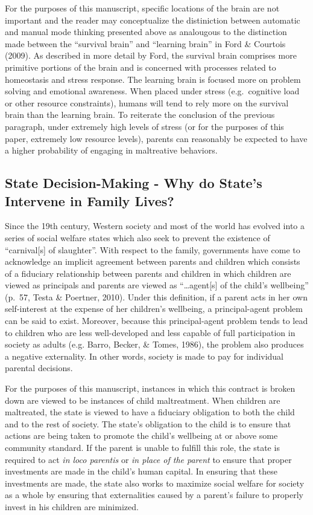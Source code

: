 \documentclass[]{elsarticle}
\begin{document}
For the purposes of this manuscript, specific locations of the brain are
not important and the reader may conceptualize the distiniction between
automatic and manual mode thinking presented above as analougous to the
distinction made between the ``survival brain'' and ``learning brain''
in Ford \& Courtois (2009). As described in more detail by Ford, the
survival brain comprises more primitive portions of the brain and is
concerned with processes related to homeostasis and stress response. The
learning brain is focused more on problem solving and emotional
awareness. When placed under stress (e.g.~cognitive load or other
resource constraints), humans will tend to rely more on the survival
brain than the learning brain. To reiterate the conclusion of the
previous paragraph, under extremely high levels of stress (or for the
purposes of this paper, extremely low resource levels), parents can
reasonably be expected to have a higher probability of engaging in
maltreative behaviors.

\subsection{State Decision-Making - Why do State's Intervene in Family
Lives?}\label{state-decision-making---why-do-states-intervene-in-family-lives}

Since the 19th century, Western society and most of the world has
evolved into a series of social welfare states which also seek to
prevent the existence of ``carnival{[}s{]} of slaughter''. With respect
to the family, governments have come to acknowledge an implicit
agreement between parents and children which consists of a fiduciary
relationship between parents and children in which children are viewed
as principals and parents are viewed as ``\ldots{}agent{[}s{]} of the
child's wellbeing'' (p.~57, Testa \& Poertner, 2010). Under this
definition, if a parent acts in her own self-interest at the expense of
her children's wellbeing, a principal-agent problem can be said to
exist. Moreover, because this principal-agent problem tends to lead to
children who are less well-developed and less capable of full
participation in society as adults (e.g. Barro, Becker, \& Tomes, 1986),
the problem also produces a negative externality. In other words,
society is made to pay for individual parental decisions.

For the purposes of this manuscript, instances in which this contract is
broken down are viewed to be instances of child maltreatment. When
children are maltreated, the state is viewed to have a fiduciary
obligation to both the child and to the rest of society. The state's
obligation to the child is to ensure that actions are being taken to
promote the child's wellbeing at or above some community standard. If
the parent is unable to fulfill this role, the state is required to act
\emph{in loco parentis} or \emph{in place of the parent} to ensure that
proper investments are made in the child's human capital. In ensuring
that these investments are made, the state also works to maximize social
welfare for society as a whole by ensuring that externalities caused by
a parent's failure to properly invest in his children are minimized.
\end{document}
